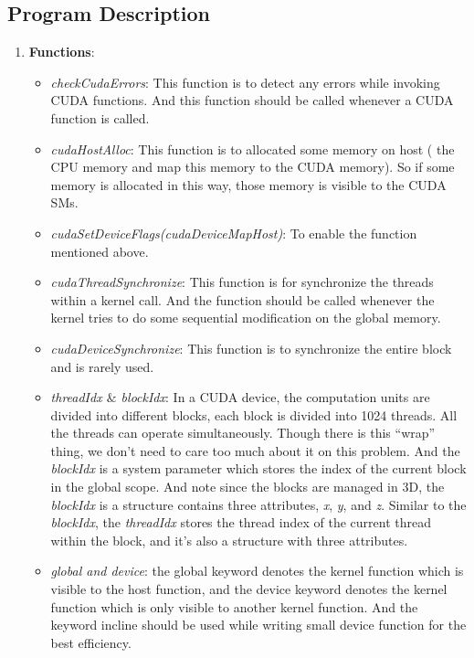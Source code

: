 \documentclass[11pt,reqno]{article}
\begin{document}
\subsection*{Program Description}
\begin{enumerate}
		\item [] \textbf{Functions}: \ 
				\begin{itemize}
						\item \textit{checkCudaErrors}: This function is to detect any errors while invoking CUDA functions. And this function should be called whenever a CUDA function is called.
						\item \textit{cudaHostAlloc}: This function is to allocated some memory on host ( the CPU memory and map this memory to the CUDA memory). So if some memory is allocated in this way, those memory is visible to the CUDA SMs.
						\item \textit{cudaSetDeviceFlags(cudaDeviceMapHost)}: To enable the function mentioned above.
						\item \textit{cudaThreadSynchronize}: This function is for synchronize the threads within a kernel call. And the function should be called whenever the kernel tries to do some sequential modification on the global memory.
						\item \textit{cudaDeviceSynchronize}: This function is to synchronize the entire block and is rarely used.
						\item \textit{threadIdx $\&$ blockIdx}: In a CUDA device, the computation units are divided into different blocks, each block is divided into 1024 threads. All the threads can operate simultaneously. Though there is this ``wrap'' thing, we don't need to care too much about it on this problem. And the \textit{blockIdx} is a system parameter which stores the index of the current block in the global scope. And note since the blocks are managed in 3D, the \textit{blockIdx} is a structure contains three attributes, \textit{x}, \textit{y}, and \textit{z}. Similar to the \textit{blockIdx}, the \textit{threadIdx} stores the thread index of the current thread within the block, and it's also a structure with three attributes.
						\item \textit{global and device}: the global keyword denotes the kernel function which is visible to the host function, and the device keyword denotes the kernel function which is only visible to another kernel function. And the keyword incline should be used while writing small device function for the best efficiency. 

				\end{itemize}
\end{enumerate}
\end{document}
